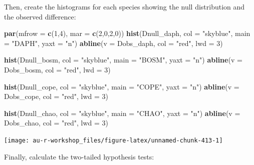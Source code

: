 \documentclass[]{book}
\newenvironment{Shaded}{\begin{snugshade}}{\end{snugshade}}
\newcommand{\DataTypeTok}[1]{\textcolor[rgb]{0.13,0.29,0.53}{#1}}
\newcommand{\DecValTok}[1]{\textcolor[rgb]{0.00,0.00,0.81}{#1}}
\newcommand{\KeywordTok}[1]{\textcolor[rgb]{0.13,0.29,0.53}{\textbf{#1}}}
\newcommand{\NormalTok}[1]{#1}
\newcommand{\StringTok}[1]{\textcolor[rgb]{0.31,0.60,0.02}{#1}}
\begin{document}
Then, create the histograms for each species showing the null distribution and the observed difference:

\begin{Shaded}
\begin{Highlighting}[]
\KeywordTok{par}\NormalTok{(}\DataTypeTok{mfrow =} \KeywordTok{c}\NormalTok{(}\DecValTok{1}\NormalTok{,}\DecValTok{4}\NormalTok{), }\DataTypeTok{mar =} \KeywordTok{c}\NormalTok{(}\DecValTok{2}\NormalTok{,}\DecValTok{0}\NormalTok{,}\DecValTok{2}\NormalTok{,}\DecValTok{0}\NormalTok{))}
\KeywordTok{hist}\NormalTok{(Dnull_daph, }\DataTypeTok{col =} \StringTok{"skyblue"}\NormalTok{, }\DataTypeTok{main =} \StringTok{"DAPH"}\NormalTok{, }\DataTypeTok{yaxt =} \StringTok{"n"}\NormalTok{)}
\KeywordTok{abline}\NormalTok{(}\DataTypeTok{v =}\NormalTok{ Dobs_daph, }\DataTypeTok{col =} \StringTok{"red"}\NormalTok{, }\DataTypeTok{lwd =} \DecValTok{3}\NormalTok{)}

\KeywordTok{hist}\NormalTok{(Dnull_bosm, }\DataTypeTok{col =} \StringTok{"skyblue"}\NormalTok{, }\DataTypeTok{main =} \StringTok{"BOSM"}\NormalTok{, }\DataTypeTok{yaxt =} \StringTok{"n"}\NormalTok{)}
\KeywordTok{abline}\NormalTok{(}\DataTypeTok{v =}\NormalTok{ Dobs_bosm, }\DataTypeTok{col =} \StringTok{"red"}\NormalTok{, }\DataTypeTok{lwd =} \DecValTok{3}\NormalTok{)}

\KeywordTok{hist}\NormalTok{(Dnull_cope, }\DataTypeTok{col =} \StringTok{"skyblue"}\NormalTok{, }\DataTypeTok{main =} \StringTok{"COPE"}\NormalTok{, }\DataTypeTok{yaxt =} \StringTok{"n"}\NormalTok{)}
\KeywordTok{abline}\NormalTok{(}\DataTypeTok{v =}\NormalTok{ Dobs_cope, }\DataTypeTok{col =} \StringTok{"red"}\NormalTok{, }\DataTypeTok{lwd =} \DecValTok{3}\NormalTok{)}

\KeywordTok{hist}\NormalTok{(Dnull_chao, }\DataTypeTok{col =} \StringTok{"skyblue"}\NormalTok{, }\DataTypeTok{main =} \StringTok{"CHAO"}\NormalTok{, }\DataTypeTok{yaxt =} \StringTok{"n"}\NormalTok{)}
\KeywordTok{abline}\NormalTok{(}\DataTypeTok{v =}\NormalTok{ Dobs_chao, }\DataTypeTok{col =} \StringTok{"red"}\NormalTok{, }\DataTypeTok{lwd =} \DecValTok{3}\NormalTok{)}
\end{Highlighting}
\end{Shaded}

\begin{center}\texttt{[image: au-r-workshop\_files/figure-latex/unnamed-chunk-413-1]} \end{center}

Finally, calculate the two-tailed hypothesis tests:
\end{document}
